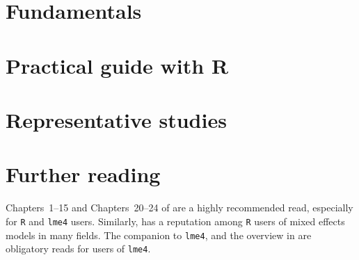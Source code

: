 \documentclass[graybox]{svmult}
\begin{document}
\section{Fundamentals}
\label{sec:fundamentals}




\section{Practical guide with R}
\label{sec:practicalguidewithr}



\newpage
\section{Representative studies}



\section{Further reading}
\label{sec:furtherreading}

Chapters~1--15 and Chapters~20--24 of \citet{GelmanHill2007} are a highly recommended read, especially for \texttt{R} and \texttt{lme4} users.
Similarly, \citet{ZuurEa2009} has a reputation among \texttt{R} users of mixed effects models in many fields.
The companion to \texttt{lme4}, \citet{Bates2010} and the overview in \citet{BatesEa2015} are obligatory reads for users of \texttt{lme4}.

\printbibliography
%
\end{document}
